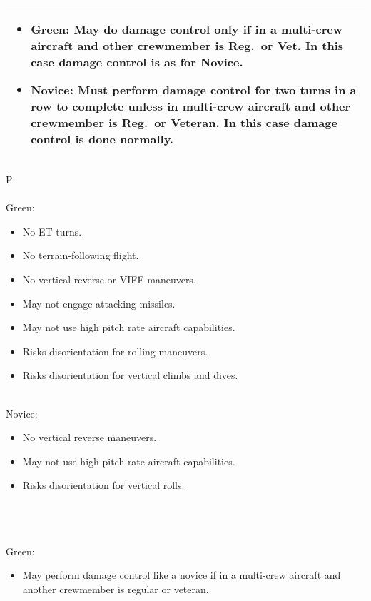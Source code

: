 \begin{onecolumntable}
{\begin{tabularx}{\linewidth}{X}
\begin{itemize}
    \item Green: May do damage control only if in a multi-crew aircraft and other crewmember is Reg.\ or Vet. In this case damage control is as for Novice.
    \item Novice: Must perform damage control for two turns in a row to complete unless in multi-crew aircraft and other crewmember is Reg.\ or Veteran. In this case damage control is done normally.
\end{itemize}
\\
\bottomrule
\end{tabularx}
}{
\begin{tabularx}{\linewidth}{P}
\toprule
{}\\
\midrule
\\
Green:\\
\begin{itemize}
\item No ET turns.
\item No terrain-following flight.
\item No vertical reverse or VIFF maneuvers.
\item May not engage attacking missiles.
\item May not use high pitch rate aircraft capabilities.
\item Risks disorientation for rolling maneuvers.
\item Risks disorientation for vertical climbs and dives.
\end{itemize}\\
Novice:\\
\begin{itemize}
    \item No vertical reverse maneuvers.
    \item May not use high pitch rate aircraft capabilities.
    \item Risks disorientation for vertical rolls.
\end{itemize}\\
\midrule
{}\\
\midrule
\\
Green:\\
\begin{itemize}
\item May perform damage control like a novice if in a multi-crew aircraft and another crewmember is regular or veteran.

\end{itemize}
\end{tabularx}}
\end{onecolumntable}
